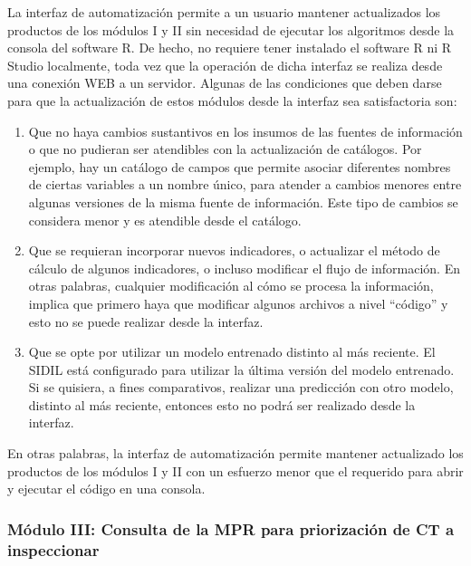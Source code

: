 \documentclass[
]{article}
\begin{document}
\begin{rmdcomment}
La interfaz de automatización permite a un usuario mantener actualizados
los productos de los módulos I y II sin necesidad de ejecutar los
algoritmos desde la consola del software R. De hecho, no requiere tener
instalado el software R ni R Studio localmente, toda vez que la
operación de dicha interfaz se realiza desde una conexión WEB a un
servidor. Algunas de las condiciones que deben darse para que la
actualización de estos módulos desde la interfaz sea satisfactoria son:

\begin{enumerate}
\def\labelenumi{\arabic{enumi})}
\item
  Que no haya cambios sustantivos en los insumos de las fuentes de
  información o que no pudieran ser atendibles con la actualización de
  catálogos. Por ejemplo, hay un catálogo de campos que permite asociar
  diferentes nombres de ciertas variables a un nombre único, para
  atender a cambios menores entre algunas versiones de la misma fuente
  de información. Este tipo de cambios se considera menor y es atendible
  desde el catálogo.
\item
  Que se requieran incorporar nuevos indicadores, o actualizar el método
  de cálculo de algunos indicadores, o incluso modificar el flujo de
  información. En otras palabras, cualquier modificación al cómo se
  procesa la información, implica que primero haya que modificar algunos
  archivos a nivel ``código'' y esto no se puede realizar desde la
  interfaz.
\item
  Que se opte por utilizar un modelo entrenado distinto al más reciente.
  El SIDIL está configurado para utilizar la última versión del modelo
  entrenado. Si se quisiera, a fines comparativos, realizar una
  predicción con otro modelo, distinto al más reciente, entonces esto no
  podrá ser realizado desde la interfaz.
\end{enumerate}

En otras palabras, la interfaz de automatización permite mantener
actualizado los productos de los módulos I y II con un esfuerzo menor
que el requerido para abrir y ejecutar el código en una consola.
\end{rmdcomment}

\hypertarget{muxf3dulo-iii-consulta-de-la-mpr-para-priorizaciuxf3n-de-ct-a-inspeccionar}{%
\subsubsection{Módulo III: Consulta de la MPR para priorización de CT a inspeccionar}\label{muxf3dulo-iii-consulta-de-la-mpr-para-priorizaciuxf3n-de-ct-a-inspeccionar}}
\end{document}
